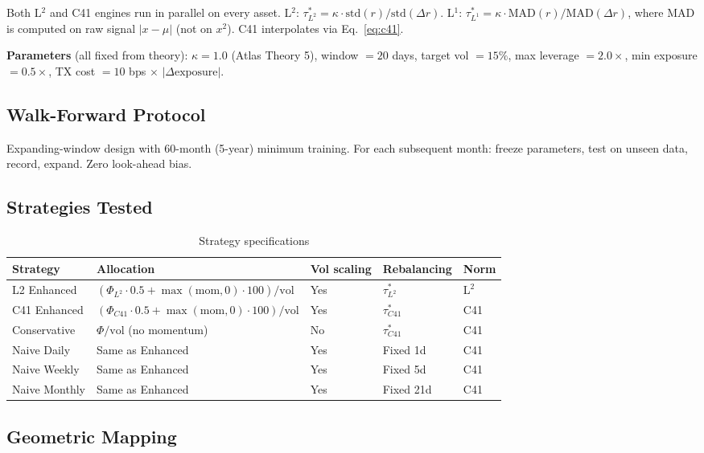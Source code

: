 \documentclass[11pt,a4paper]{article}
\begin{document}
Both L$^2$ and C41 engines run in parallel on every asset. L$^2$: $\tau^*_{L^2} = \kappa \cdot \mathrm{std}(r) / \mathrm{std}(\Delta r)$. L$^1$: $\tau^*_{L^1} = \kappa \cdot \mathrm{MAD}(r) / \mathrm{MAD}(\Delta r)$, where MAD is computed on raw signal $|x - \mu|$ (not on $x^2$). C41 interpolates via Eq.~\eqref{eq:c41}.

\textbf{Parameters} (all fixed from theory): $\kappa = 1.0$ (Atlas Theory 5), window $= 20$ days, target vol $= 15\%$, max leverage $= 2.0\times$, min exposure $= 0.5\times$, TX cost $= 10$ bps $\times$ $|\Delta\text{exposure}|$.

\subsection{Walk-Forward Protocol}

Expanding-window design with 60-month (5-year) minimum training. For each subsequent month: freeze parameters, test on unseen data, record, expand. Zero look-ahead bias.

\subsection{Strategies Tested}

\begin{table}[H]
\centering
\caption{Strategy specifications}
\label{tab:strategies}
\begin{tabular}{lllll}
\toprule
Strategy & Allocation & Vol scaling & Rebalancing & Norm \\
\midrule
L2 Enhanced & $(\Phi_{L^2} \cdot 0.5 + \max(\text{mom},0) \cdot 100)/\text{vol}$ & Yes & $\tau^*_{L^2}$ & L$^2$ \\
C41 Enhanced & $(\Phi_{C41} \cdot 0.5 + \max(\text{mom},0) \cdot 100)/\text{vol}$ & Yes & $\tau^*_{C41}$ & C41 \\
Conservative & $\Phi/\text{vol}$ (no momentum) & No & $\tau^*_{C41}$ & C41 \\
Naive Daily & Same as Enhanced & Yes & Fixed 1d & C41 \\
Naive Weekly & Same as Enhanced & Yes & Fixed 5d & C41 \\
Naive Monthly & Same as Enhanced & Yes & Fixed 21d & C41 \\
\bottomrule
\end{tabular}
\end{table}

\subsection{Geometric Mapping}
\end{document}
